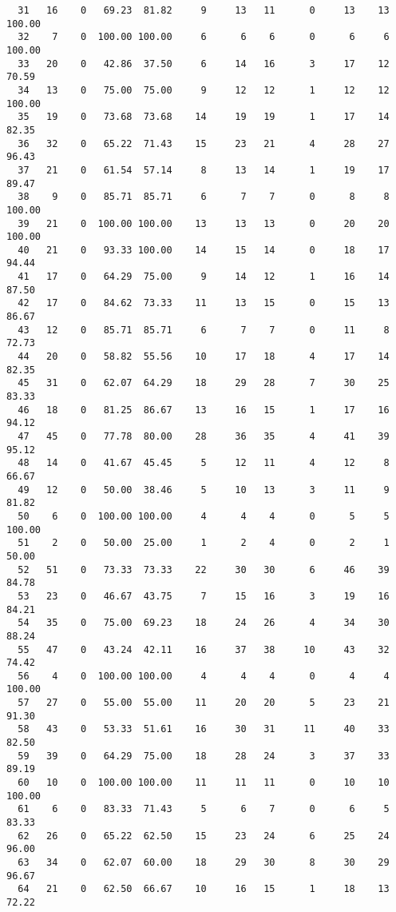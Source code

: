 \begin{verbatim}
  31   16    0   69.23  81.82     9     13   11      0     13    13   100.00
  32    7    0  100.00 100.00     6      6    6      0      6     6   100.00
  33   20    0   42.86  37.50     6     14   16      3     17    12    70.59
  34   13    0   75.00  75.00     9     12   12      1     12    12   100.00
  35   19    0   73.68  73.68    14     19   19      1     17    14    82.35
  36   32    0   65.22  71.43    15     23   21      4     28    27    96.43
  37   21    0   61.54  57.14     8     13   14      1     19    17    89.47
  38    9    0   85.71  85.71     6      7    7      0      8     8   100.00
  39   21    0  100.00 100.00    13     13   13      0     20    20   100.00
  40   21    0   93.33 100.00    14     15   14      0     18    17    94.44
  41   17    0   64.29  75.00     9     14   12      1     16    14    87.50
  42   17    0   84.62  73.33    11     13   15      0     15    13    86.67
  43   12    0   85.71  85.71     6      7    7      0     11     8    72.73
  44   20    0   58.82  55.56    10     17   18      4     17    14    82.35
  45   31    0   62.07  64.29    18     29   28      7     30    25    83.33
  46   18    0   81.25  86.67    13     16   15      1     17    16    94.12
  47   45    0   77.78  80.00    28     36   35      4     41    39    95.12
  48   14    0   41.67  45.45     5     12   11      4     12     8    66.67
  49   12    0   50.00  38.46     5     10   13      3     11     9    81.82
  50    6    0  100.00 100.00     4      4    4      0      5     5   100.00
  51    2    0   50.00  25.00     1      2    4      0      2     1    50.00
  52   51    0   73.33  73.33    22     30   30      6     46    39    84.78
  53   23    0   46.67  43.75     7     15   16      3     19    16    84.21
  54   35    0   75.00  69.23    18     24   26      4     34    30    88.24
  55   47    0   43.24  42.11    16     37   38     10     43    32    74.42
  56    4    0  100.00 100.00     4      4    4      0      4     4   100.00
  57   27    0   55.00  55.00    11     20   20      5     23    21    91.30
  58   43    0   53.33  51.61    16     30   31     11     40    33    82.50
  59   39    0   64.29  75.00    18     28   24      3     37    33    89.19
  60   10    0  100.00 100.00    11     11   11      0     10    10   100.00
  61    6    0   83.33  71.43     5      6    7      0      6     5    83.33
  62   26    0   65.22  62.50    15     23   24      6     25    24    96.00
  63   34    0   62.07  60.00    18     29   30      8     30    29    96.67
  64   21    0   62.50  66.67    10     16   15      1     18    13    72.22

\end{verbatim}
